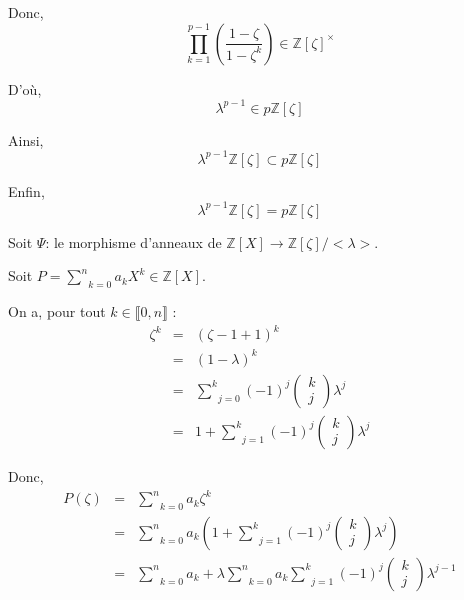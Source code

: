 Donc,
\[ \underset{k = 1}{\overset{p - 1}{\prod}} \left( \frac{1 - \zeta}{1 -
   \zeta^k} \right) \in \mathbb{Z} [\zeta]^{\times} \]


D'o{\`u},
\[ \lambda^{p - 1} \in p\mathbb{Z} [\zeta] \]


Ainsi,
\[ \lambda^{p - 1} \mathbb{Z} [\zeta] \subset p\mathbb{Z} [\zeta] \]


Enfin,
\[ \lambda^{p - 1} \mathbb{Z} [\zeta] = p\mathbb{Z} [\zeta] \]


 Soit $\Psi$: le morphisme d'anneaux de $\mathbb{Z} [X]
\rightarrow \mathbb{Z} [\zeta] / < \lambda >$.

Soit $P = \underset{k = 0}{\overset{n}{\sum}} a_k X^k \in \mathbb{Z} [X]$.

On a, pour tout $k \in \llbracket 0, n \rrbracket$ :
\begin{eqnarray*}
  \zeta^k & = & (\zeta - 1 + 1)^k\\
  & = & (1 - \lambda)^k\\
  & = & \underset{j = 0}{\overset{k}{\sum}} (- 1)^j \left( \begin{array}{c}
    k\\
    j
  \end{array} \right) \lambda^j\\
  & = & 1 + \underset{j = 1}{\overset{k}{\sum}} (- 1)^j \left(
  \begin{array}{c}
    k\\
    j
  \end{array} \right) \lambda^j
\end{eqnarray*}


Donc,
\begin{eqnarray*}
  P (\zeta) & = & \underset{k = 0}{\overset{n}{\sum}} a_k \zeta^k\\
  & = & \underset{k = 0}{\overset{n}{\sum}} a_k \left( 1 + \underset{j =
  1}{\overset{k}{\sum}} (- 1)^j \left( \begin{array}{c}
    k\\
    j
  \end{array} \right) \lambda^j \right)\\
  & = & \underset{k = 0}{\overset{n}{\sum}} a_k + \lambda \underset{k =
  0}{\overset{n}{\sum}} a_k \underset{j = 1}{\overset{k}{\sum}} (- 1)^j \left(
  \begin{array}{c}
    k\\
    j
  \end{array} \right) \lambda^{j - 1}
\end{eqnarray*}


